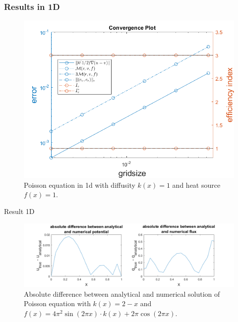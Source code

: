 \documentclass[t]{beamer}
\begin{document}
\begin{frame}
\frametitle{Results in 1D }
\vspace{-18pt}
\begin{figure}[t]
\includegraphics[width = 0.7\linewidth]{convergenceplot_k_f_constant.png}
\caption{Poisson equation in 1d with diffusity $k(x) = 1$ and heat source $f(x) = 1$.}
\label{fig:Convergence1d1}
\end{figure}
\end{frame}

\begin{frame}{Result 1D}
\begin{figure}
\centering
\includegraphics[width = 1.05\linewidth, left]{difference_analytical_numerical.png}
\caption{Absolute difference between analytical and numerical solution of Poisson equation with $k(x) = 2-x$ and $f(x) = 4\pi^2\sin(2\pi x)\cdot k(x) + 2\pi\cos(2\pi x)$.}
\label{fig:fig:diff}
\end{figure}
\end{frame}
\end{document}
